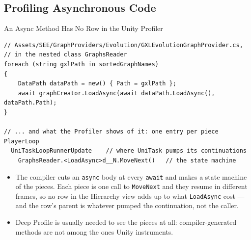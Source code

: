 \subsection{Profiling Asynchronous Code}

\begin{frame}[fragile]{An Async Method Has No Row in the Unity Profiler}
  \begin{lstlisting}[basicstyle=\scriptsize\ttfamily]
// Assets/SEE/GraphProviders/Evolution/GXLEvolutionGraphProvider.cs,
// in the nested class GraphsReader
foreach (string gxlPath in sortedGraphNames)
{
    DataPath dataPath = new() { Path = gxlPath };
    await graphCreator.LoadAsync(await dataPath.LoadAsync(), dataPath.Path);
}

// ... and what the Profiler shows of it: one entry per piece
PlayerLoop
  UniTaskLoopRunnerUpdate    // where UniTask pumps its continuations
    GraphsReader.<LoadAsync>d__N.MoveNext()   // the state machine
  \end{lstlisting}
  \vspace{0.5ex}

  \begin{itemize}
    \item The compiler cuts an \texttt{async} body at every \texttt{await} and
      makes a state machine of the pieces. Each piece is one call to
      \texttt{MoveNext} and they resume in different frames, so no row in the
      Hierarchy view adds up to what \texttt{LoadAsync} cost --- and the row's
      parent is whatever pumped the continuation, not the caller.
    \item Deep Profile is usually needed to see the pieces at all:
      compiler-generated methods are not among the ones Unity instruments.
  \end{itemize}
\end{frame}

